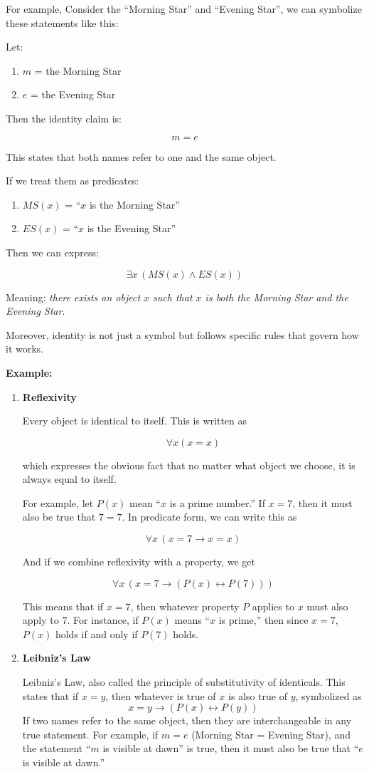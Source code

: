 \documentclass[12pt,a4paper,openany]{article}
\begin{document}
For example, Consider the ``Morning Star'' and ``Evening Star'', we can
symbolize these statements like this:

Let:
\begin{enumerate}
    \item $m$ = the Morning Star
    \item $e$ = the Evening Star
\end{enumerate}

Then the identity claim is:

\[ m = e \]

This states that both names refer to one and the same object.

If we treat them as predicates:
\begin{enumerate}
    \item $MS(x)$ = ``$x$ is the Morning Star''
    \item $ES(x)$ = ``$x$ is the Evening Star''
\end{enumerate}

Then we can express:

\[\exists x \, (MS(x) \land ES(x))\]

Meaning: \emph{there exists an object \(x\) such that \(x\) is both the
Morning Star and the Evening Star}.

Moreover, identity is not just a symbol but follows specific rules that
govern how it works.

\textbf{Example:}

\begin{enumerate}
\item
\textbf{Reflexivity}

Every object is identical to itself. This is written as

\[\forall x (x = x)\]

which expresses the obvious fact that no matter what object we choose,
it is always equal to itself.

For example, let \(P(x)\) mean ``\(x\) is a prime number.'' If
\(x = 7\), then it must also be true that \(7 = 7\). In predicate
form, we can write this as

\[\forall x \, (x = 7 \to x = x)\]

And if we combine reflexivity with a property, we get

\[\forall x \, (x = 7 \to (P(x) \leftrightarrow P(7)))\]

This means that if \(x = 7\), then whatever property \(P\) applies to
\(x\) must also apply to \(7\). For instance, if \(P(x)\) means
``\(x\) is prime,'' then since \(x = 7\), \(P(x)\) holds if and only
if \(P(7)\) holds.
\item
\textbf{Leibniz's Law}

Leibniz's Law, also called the principle of substitutivity of identicals. This states that if \(x = y\), then
whatever is true of \(x\) is also true of \(y\), symbolized as
\[x = y \rightarrow (P(x) \leftrightarrow P(y))\] If two names refer
to the same object, then they are interchangeable in any true
statement. For example, if \(m = e\) (Morning Star = Evening Star),
and the statement ``\(m\) is visible at dawn'' is true, then it must
also be true that ``\(e\) is visible at dawn.''
\end{enumerate}
\end{document}
